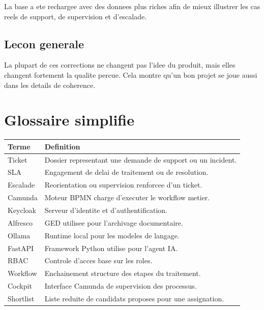 La base a ete rechargee avec des donnees plus riches afin de mieux illustrer les cas reels de support, de supervision et d'escalade.

\section{Lecon generale}

La plupart de ces corrections ne changent pas l'idee du produit, mais elles changent fortement la qualite percue. Cela montre qu'un bon projet se joue aussi dans les details de coherence.

\chapter{Glossaire simplifie}

\begingroup
\small
\setlength{\tabcolsep}{4pt}
\begin{longtable}{>{\raggedright\arraybackslash}p{3cm} >{\raggedright\arraybackslash}p{9.8cm}}
\toprule
Terme & Definition \\
\midrule
Ticket & Dossier representant une demande de support ou un incident. \\
SLA & Engagement de delai de traitement ou de resolution. \\
Escalade & Reorientation ou supervision renforcee d'un ticket. \\
Camunda & Moteur BPMN charge d'executer le workflow metier. \\
Keycloak & Serveur d'identite et d'authentification. \\
Alfresco & GED utilisee pour l'archivage documentaire. \\
Ollama & Runtime local pour les modeles de langage. \\
FastAPI & Framework Python utilise pour l'agent IA. \\
RBAC & Controle d'acces base sur les roles. \\
Workflow & Enchainement structure des etapes du traitement. \\
Cockpit & Interface Camunda de supervision des processus. \\
Shortlist & Liste reduite de candidats proposes pour une assignation. \\
\bottomrule
\end{longtable}
\endgroup

